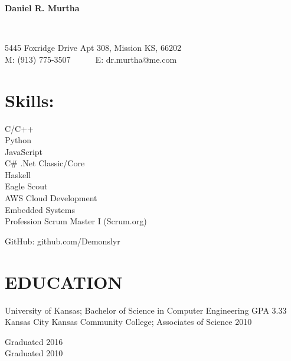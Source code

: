 \documentclass{res}
\begin{document}
\begin{resume}
	\begin{center}
		\begin{Huge}
		\textbf{Daniel R. Murtha}
		\end{Huge}
	\\
		\begin{normalsize}
			5445 Foxridge Drive Apt 308, Mission KS, 66202\\
			M: (913) 775-3507~~~~~~E: dr.murtha@me.com
		\end{normalsize}
	\end{center}\vspace{-10pt}
\section{Skills:}
{\setlength\multicolsep{0pt}
\begin{multicols}{3}
C/C++\\Python\\JavaScript\\C\# .Net Classic/Core\\
\columnbreak %
Haskell\\Eagle Scout\\AWS Cloud Development\\Embedded Systems\\Profession Scrum Master I (Scrum.org)
\columnbreak
	\begin{flushright}
	GitHub: github.com/Demonslyr\\
	\end{flushright}
\end{multicols}}\vspace{-10pt}
 
\section{EDUCATION}\vspace{5pt}
\begin{minipage}{0.8\linewidth}
	\begin{small}
		\begin{flushleft}
			University of Kansas; Bachelor of Science in Computer Engineering GPA 3.33\\Kansas City Kansas Community College; Associates of Science	2010
		\end{flushleft}
	\end{small}   
\end{minipage}
\begin{minipage}{0.2\linewidth}
	\begin{small}   
		\begin{flushright}
			Graduated 2016\\Graduated 2010
		\end{flushright}	     
	\end{small}   
\end{minipage}\vspace{-10pt}
 

\end{resume}
\end{document}
